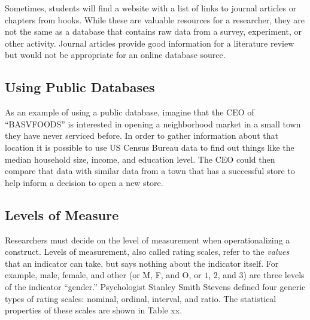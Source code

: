 Sometimes, students will find a website with a list of links to journal articles or chapters from books. While these are valuable resources for a researcher, they are not the same as a database that contains raw data from a survey, experiment, or other activity. Journal articles provide good information for a literature review but would not be appropriate for an online database source.

\subsection{Using Public Databases}

As an example of using a public database, imagine that the CEO of ``BASVFOODS'' is interested in opening a neighborhood market in a small town they have never serviced before. In order to gather information about that location it is possible to use US Census Bureau data to find out things like the median household size, income, and education level. The CEO could then compare that data with similar data from a town that has a successful store to help inform a decision to open a new store.


\subsection{Levels of Measure}

Researchers must decide on the level of measurement when operationalizing a construct. Levels of measurement, also called rating scales, refer to the \textit{values} that an indicator can take, but says nothing about the indicator itself. For example, male, female, and other (or M, F, and O, or $ 1 $, $ 2 $, and $ 3 $) are three levels of the indicator ``gender.'' Psychologist Stanley Smith Stevens defined four generic types of rating scales: nominal, ordinal, interval, and ratio\cite{stevens1946theory}. The statistical properties of these scales are shown in Table xx.


